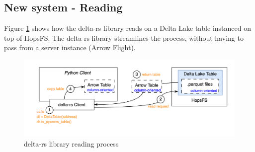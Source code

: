 \subsection{New system - Reading}

Figure \ref{fig:delta_rs_reading} shows how the delta-rs library reads on a Delta Lake table instanced on top of \gls{HopsFS}. The delta-rs library streamlines the process, without having to pass from a server instance (Arrow Flight).

\begin{figure}
    \begin{center}
      \includegraphics[width=\textwidth]{figures/2-background/delta-rs_reading.png}
    \end{center}
    \caption{delta-rs library reading process}
    \label{fig:delta_rs_reading}
\end{figure}